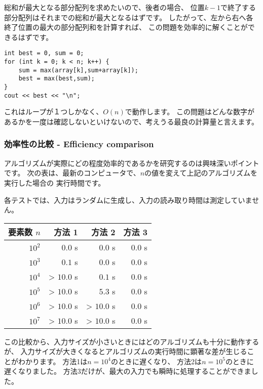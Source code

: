 総和が最大となる部分配列を求めたいので、後者の場合、
位置$k - 1$で終了する部分配列はそれまでの総和が最大となるはずです。
したがって、左から右へ各終了位置の最大の部分配列和を計算すれば、
この問題を効率的に解くことができるはずです。
\begin{lstlisting}
int best = 0, sum = 0;
for (int k = 0; k < n; k++) {
    sum = max(array[k],sum+array[k]);
    best = max(best,sum);
}
cout << best << "\n";
\end{lstlisting}

これはループが１つしかなく、$O(n)$で動作します。
この問題はどんな数字があるかを一度は確認しないといけないので、考えうる最良の計算量と言えます。

\subsubsection{効率性の比較 - Efficiency comparison}

アルゴリズムが実際にどの程度効率的であるかを研究するのは興味深いポイントです。
次の表は、最新のコンピュータで、$n$の値を変えて上記のアルゴリズムを実行した場合の
実行時間です。

各テストでは、入力はランダムに生成し、入力の読み取り時間は測定していません。

\begin{center}
\begin{tabular}{rrrr}
要素数 $n$ & 方法 1 & 方法 2 & 方法 3 \\
\hline
$10^2$ & $0.0$ s & $0.0$ s & $0.0$ s \\
$10^3$ & $0.1$ s & $0.0$ s & $0.0$ s \\
$10^4$ & > $10.0$ s & $0.1$ s & $0.0$ s \\
$10^5$ & > $10.0$ s & $5.3$ s & $0.0$ s \\
$10^6$ & > $10.0$ s & > $10.0$ s & $0.0$ s \\
$10^7$ & > $10.0$ s & > $10.0$ s & $0.0$ s \\
\end{tabular}
\end{center}

この比較から、入力サイズが小さいときにはどのアルゴリズムも十分に動作するが、
入力サイズが大きくなるとアルゴリズムの実行時間に顕著な差が生じることがわかります。
方法1は$n=10^4$のときに遅くなり、
方法2は$n=10^5$のときに遅くなりました。
方法3だけが、最大の入力でも瞬時に処理することができました。

